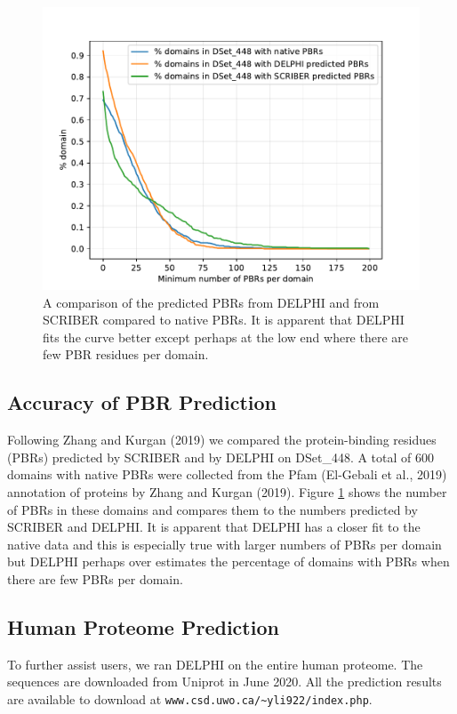 \begin{figure}
\centering
\includegraphics[width=\columnwidth]{img/plot_DS448_domain.pdf}
  \caption[A comparison of the predicted PBRs from DELPHI and from SCRIBER compared to native PBRs.]{A comparison of the predicted PBRs from DELPHI and from SCRIBER compared to native PBRs. It is apparent that DELPHI fits the curve better except perhaps at the low end where there are few PBR residues per domain.} 
  \label{fig_plot_DS448_domain}
\end{figure}


\subsection{\textcolor{\mySecondColor}{Accuracy of PBR Prediction}}
\textcolor{\mySecondColor}{Following Zhang and Kurgan (2019) we compared the protein-binding residues (PBRs) predicted by SCRIBER and by DELPHI on DSet\_448.  
A total of 600 domains with native PBRs were collected from the Pfam (El-Gebali et al., 2019) annotation of proteins by Zhang and Kurgan (2019).  
Figure \ref{fig_plot_DS448_domain} shows the number of PBRs in these domains and compares them to the numbers predicted by SCRIBER and DELPHI. 
It is apparent that DELPHI has a closer fit to the native data and this is especially 
true with larger numbers of PBRs per domain but DELPHI perhaps over estimates the percentage of domains with PBRs when there are few PBRs per domain.}

\subsection{\textcolor{\mySecondColor}{Human Proteome Prediction}}
\textcolor{\mySecondColor}{
To further assist users, we ran DELPHI on the entire human proteome. The sequences are downloaded from Uniprot in June 2020. All the prediction results are available to download at \texttt{www.csd.uwo.ca/\textasciitilde{}yli922/index.php}.
}

